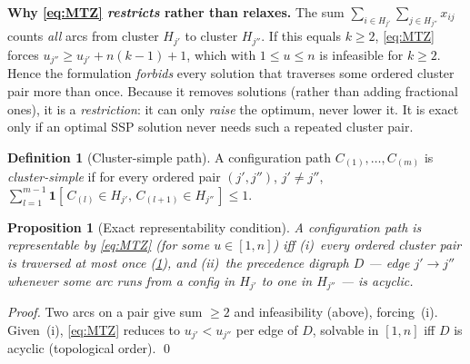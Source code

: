 \documentclass[11pt,a4paper]{article}
\theoremstyle{plain}
\newtheorem{proposition}[theorem]{Proposition}
\theoremstyle{definition}
\newtheorem{definition}[theorem]{Definition}
\begin{document}
\begin{warnbox}
	\textbf{Why \eqref{eq:MTZ} \emph{restricts} rather than relaxes.}
	The sum $\sum_{i\in H_{j'}}\sum_{j\in H_{j''}} x_{ij}$ counts \emph{all} arcs from cluster
	$H_{j'}$ to cluster $H_{j''}$. If this equals $k\ge 2$, \eqref{eq:MTZ} forces
	$u_{j''}\ge u_{j'}+n(k-1)+1$, which with $1\le u\le n$ is infeasible for $k\ge2$. Hence the
	formulation \emph{forbids} every solution that traverses some ordered cluster pair more than
	once. Because it removes solutions (rather than adding fractional ones), it is a
	\emph{restriction}: it can only \emph{raise} the optimum, never lower it. It is exact only
	if an optimal SSP solution never needs such a repeated cluster pair.
\end{warnbox}

\begin{thmbox}
	\begin{definition}[Cluster-simple path]
		\label{def:cluster-simple}
		A configuration path $C_{(1)},\dots,C_{(m)}$ is \emph{cluster-simple} if for every
		ordered pair $(j',j'')$, $j'\ne j''$,
		$\sum_{l=1}^{m-1}\mathbf{1}[\,C_{(l)}\in H_{j'},\,C_{(l+1)}\in H_{j''}\,]\le 1$.
	\end{definition}
\end{thmbox}

\begin{thmbox}
	\begin{proposition}[Exact representability condition]
	\label{prop:representable}
	A configuration path is representable by \eqref{eq:MTZ} (for some $u\in[1,n]$) \emph{iff}
	(i)~every ordered cluster pair is traversed at most once (\cref{def:cluster-simple}), and
	(ii)~the precedence digraph $D$ --- edge $j'\!\to\!j''$ whenever some arc runs from a config
	in $H_{j'}$ to one in $H_{j''}$ --- is \emph{acyclic}.
	\end{proposition}
\end{thmbox}
\begin{proofbox}
	\begin{proof}
	Two arcs on a pair give sum $\ge2$ and infeasibility (above), forcing~(i). Given~(i),
	\eqref{eq:MTZ} reduces to $u_{j'}<u_{j''}$ per edge of $D$, solvable in $[1,n]$ iff $D$ is
	acyclic (topological order). \qed
	\end{proof}
\end{proofbox}
\end{document}
